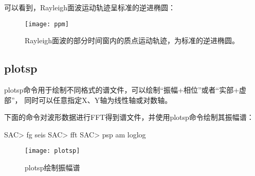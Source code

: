 可以看到，Rayleigh面波运动轨迹呈标准的逆进椭圆：
\begin{figure}[H]
\centering
\texttt{[image: ppm]}
\caption[质点运动图。]{Rayleigh面波的部分时间窗内的质点运动轨迹，为标准的逆进椭圆。}
\label{fig:ppm}
\end{figure}

\subsection{plotsp}
plotsp命令用于绘制不同格式的谱文件，可以绘制``振幅+相位''或者``实部+虚部''，
同时可以任意指定X、Y轴为线性轴或对数轴。

下面的命令对波形数据进行FFT得到谱文件，并使用plotsp命令绘制其振幅谱：
\begin{SACCode}
SAC> fg seis
SAC> fft
SAC> psp am loglog
\end{SACCode}

\begin{figure}[H]
\centering
\texttt{[image: plotsp]}
\caption{plotsp绘制振幅谱}
\label{fig:plotsp}
\end{figure}
